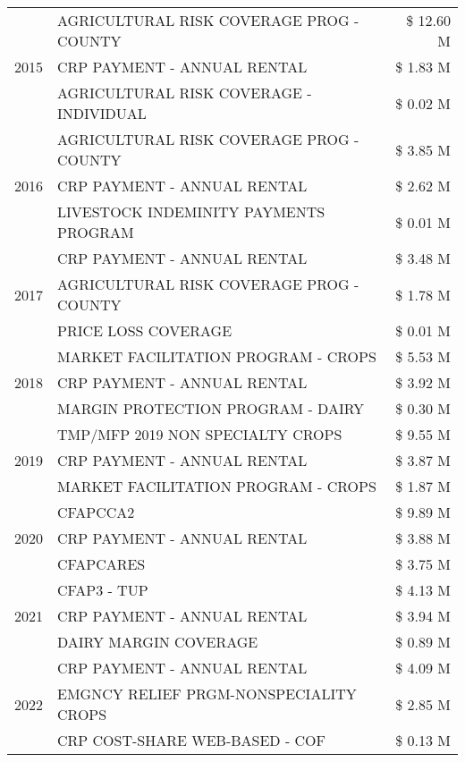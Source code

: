 \begin{tabular}{llr}
\multirow[t]{3}{*}{2015} & AGRICULTURAL RISK COVERAGE PROG - COUNTY & \$ 12.60 M \\
 & CRP PAYMENT - ANNUAL RENTAL & \$ 1.83 M \\
 & AGRICULTURAL RISK COVERAGE - INDIVIDUAL & \$ 0.02 M \\
\cline{1-3}
\multirow[t]{3}{*}{2016} & AGRICULTURAL RISK COVERAGE PROG - COUNTY & \$ 3.85 M \\
 & CRP PAYMENT - ANNUAL RENTAL & \$ 2.62 M \\
 & LIVESTOCK INDEMINITY PAYMENTS PROGRAM & \$ 0.01 M \\
\cline{1-3}
\multirow[t]{3}{*}{2017} & CRP PAYMENT - ANNUAL RENTAL & \$ 3.48 M \\
 & AGRICULTURAL RISK COVERAGE PROG - COUNTY & \$ 1.78 M \\
 & PRICE LOSS COVERAGE & \$ 0.01 M \\
\cline{1-3}
\multirow[t]{3}{*}{2018} & MARKET FACILITATION PROGRAM - CROPS & \$ 5.53 M \\
 & CRP PAYMENT - ANNUAL RENTAL & \$ 3.92 M \\
 & MARGIN PROTECTION PROGRAM - DAIRY & \$ 0.30 M \\
\cline{1-3}
\multirow[t]{3}{*}{2019} & TMP/MFP 2019 NON SPECIALTY CROPS & \$ 9.55 M \\
 & CRP PAYMENT - ANNUAL RENTAL & \$ 3.87 M \\
 & MARKET FACILITATION PROGRAM - CROPS & \$ 1.87 M \\
\cline{1-3}
\multirow[t]{3}{*}{2020} & CFAPCCA2 & \$ 9.89 M \\
 & CRP PAYMENT - ANNUAL RENTAL & \$ 3.88 M \\
 & CFAPCARES & \$ 3.75 M \\
\cline{1-3}
\multirow[t]{3}{*}{2021} & CFAP3 - TUP & \$ 4.13 M \\
 & CRP PAYMENT - ANNUAL RENTAL & \$ 3.94 M \\
 & DAIRY MARGIN COVERAGE & \$ 0.89 M \\
\cline{1-3}
\multirow[t]{3}{*}{2022} & CRP PAYMENT - ANNUAL RENTAL & \$ 4.09 M \\
 & EMGNCY RELIEF PRGM-NONSPECIALITY CROPS & \$ 2.85 M \\
 & CRP COST-SHARE WEB-BASED - COF & \$ 0.13 M \\
\cline{1-3}
\bottomrule
\end{tabular}
